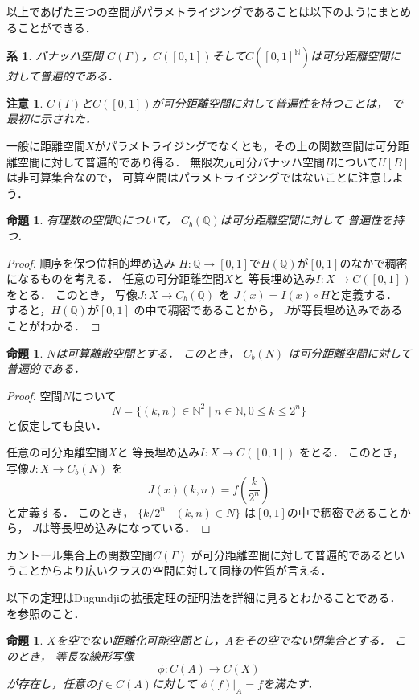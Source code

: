\documentclass[leqno, a4paper, 12pt]{jsarticle}
\newtheorem{prop}[thm]{命題}
\newtheorem{cor}[thm]{系}
\newtheorem*{rmk}{注意}
\newcommand{\nn}{\mathbb{N}}
\newcommand{\qq}{\mathbb{Q}}
\begin{document}
以上であげた三つの空間がパラメトライジングであることは以下のようにまとめることができる．
\begin{cor}
バナッハ空間
$C(\Gamma)$，$C([0, 1])$そして$C([0, 1]^{\nn})$は可分距離空間に対して普遍的である．
\end{cor}

\begin{rmk}
$C(\Gamma)$と$C([0, 1])$が可分距離空間に対して普遍性を持つことは，
\emph{\cite{B}}で最初に示された．
\end{rmk}




一般に距離空間$X$がパラメトライジングでなくとも，その上の関数空間は可分距離空間に対して普遍的であり得る．
無限次元可分バナッハ空間$B$について$U[B]$は非可算集合なので，
可算空間はパラメトライジングではないことに注意しよう．
\begin{prop}
有理数の空間$\qq$について，
$C_b(\qq)$は可分距離空間に対して
普遍性を持つ．
\end{prop}
\begin{proof}
順序を保つ位相的埋め込み
$H: \qq\to [0, 1]$で$H(\qq)$が$[0, 1]$のなかで稠密になるものを考える．
任意の可分距離空間$X$と
等長埋め込み$I: X\to C([0, 1])$
をとる．
このとき，
写像$J: X\to C_b(\qq)$
を
$J(x)=I(x)\circ H$と定義する．
すると，$H(\qq)$が$[0, 1]$
の中で稠密であることから，
$J$が等長埋め込みであることがわかる．
\end{proof}

\begin{prop}
$N$は可算離散空間とする．
このとき， $C_b(N)$
は可分距離空間に対して普遍的である．
\end{prop}
\begin{proof}
空間$N$について
\[
N=\{(k, n)\in \nn^2\mid n\in \nn, 0\le k\le 2^n\}
\]
と仮定しても良い．

任意の可分距離空間$X$と
等長埋め込み$I: X\to C([0, 1])$
をとる．
このとき，
写像$J: X\to C_b(N)$
を
\[
J(x)(k, n)=f\left(\frac{k}{2^n}\right)
\]
と定義する．
このとき，
$\{k/2^n\mid (k, n)\in N\}$
は$[0, 1]$の中で稠密であることから，
$J$は等長埋め込みになっている．
\end{proof}

カントール集合上の関数空間$C(\Gamma)$
が可分距離空間に対して普遍的であるということからより広いクラスの空間に対して同様の性質が言える．


以下の定理はDugundjiの拡張定理の証明法を詳細に見るとわかることである．\cite[Theorem 5.1]{1}を参照のこと．
\begin{prop}\label{prop:d}
$X$を空でない距離化可能空間とし，$A$をその空でない閉集合とする．
このとき，
等長な線形写像
\[
\phi: C(A)\to C(X)
\]
が存在し，任意の$f\in C(A)$に対して
$\phi(f)|_A=f$を満たす．
\end{prop}
\end{document}
